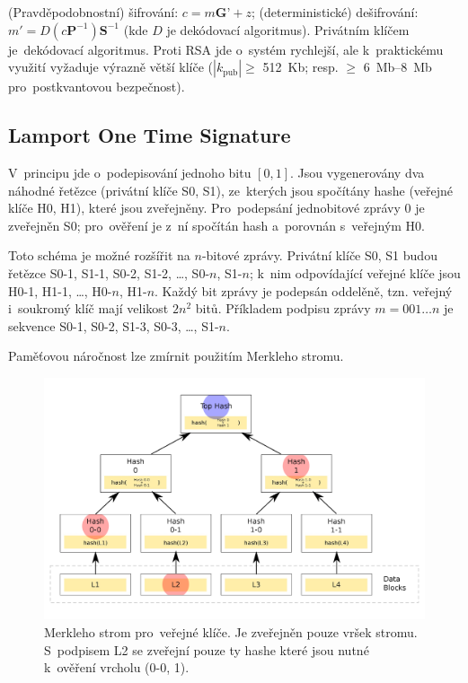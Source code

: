 (Pravděpodobnostní) šifrování: $c = m\textbf{G'} + z$; (deterministické) dešifrování: $m' = D(c\textbf{P}^{-1})\textbf{S}^{-1}$ (kde $D$ je dekódovací algoritmus).
Privátním klíčem je~dekódovací algoritmus.
Proti RSA jde o~systém rychlejší, ale k~praktickému využití vyžaduje výrazně větší klíče ($| k_\text{pub} | \geq$ 512~Kb; resp. $\geq$ 6~Mb--8~Mb pro~postkvantovou bezpečnost).


\subsection{Lamport One Time Signature}

V~principu jde o~podepisování jednoho bitu $[0,1]$.
Jsou vygenerovány dva náhodné řetězce (privátní klíče S0, S1), ze~kterých jsou spočítány hashe (veřejné klíče H0, H1), které jsou zveřejněny.
Pro~podepsání jednobitové zprávy $0$ je zveřejněn S0; pro~ověření je z~ní spočítán hash a~porovnán s~veřejným H0.

Toto schéma je možné rozšířit na $n$-bitové zprávy.
Privátní klíče S0, S1 budou řetězce S0-1, S1-1, S0-2, S1-2, \dots, S0-$n$, S1-$n$;
k~nim odpovídající veřejné klíče jsou H0-1, H1-1, \dots, H0-$n$, H1-$n$.
Každý bit zprávy je podepsán oddelěně, tzn. veřejný i~soukromý klíč mají velikost $2n^2$ bitů.
Příkladem podpisu zprávy $m = 001\dots{}n$ je sekvence S0-1, S0-2, S1-3, S0-3, \dots, S1-$n$.

Paměťovou náročnost lze zmírnit použitím Merkleho stromu.

\begin{figure}[ht]
    \centering
    \includegraphics[width=\textwidth]{img/hash-merkle-tree}
    \caption[Merkleho strom pro~hashe]{Merkleho strom pro~veřejné klíče. Je zveřejněn pouze vršek stromu. S~podpisem L2 se zveřejní pouze ty hashe které jsou nutné k~ověření vrcholu (0-0, 1).}
\end{figure}

